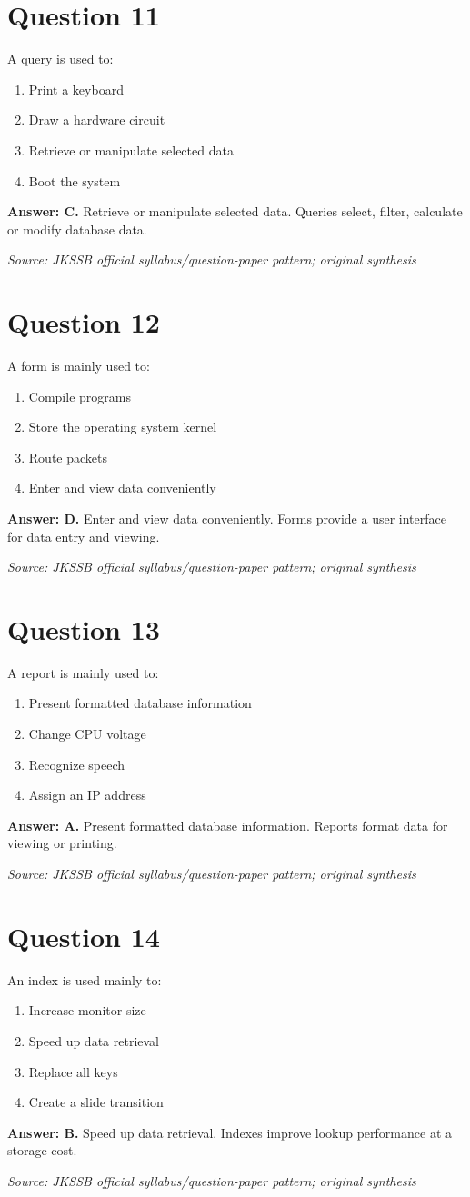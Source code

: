 \documentclass[11pt,a4paper]{book}
\newcommand{\source}[1]{\par\smallskip\textit{Source: #1}}
\newcommand{\answer}[2]{\par\textbf{Answer: #1.} #2}
\begin{document}
\section*{Question 11}
A query is used to:
\begin{enumerate}[label=\Alph*.]
\item Print a keyboard
\item Draw a hardware circuit
\item Retrieve or manipulate selected data
\item Boot the system
\end{enumerate}
\answer{C}{Retrieve or manipulate selected data. Queries select, filter, calculate or modify database data.}
\source{JKSSB official syllabus/question-paper pattern; original synthesis}
\section*{Question 12}
A form is mainly used to:
\begin{enumerate}[label=\Alph*.]
\item Compile programs
\item Store the operating system kernel
\item Route packets
\item Enter and view data conveniently
\end{enumerate}
\answer{D}{Enter and view data conveniently. Forms provide a user interface for data entry and viewing.}
\source{JKSSB official syllabus/question-paper pattern; original synthesis}
\section*{Question 13}
A report is mainly used to:
\begin{enumerate}[label=\Alph*.]
\item Present formatted database information
\item Change CPU voltage
\item Recognize speech
\item Assign an IP address
\end{enumerate}
\answer{A}{Present formatted database information. Reports format data for viewing or printing.}
\source{JKSSB official syllabus/question-paper pattern; original synthesis}
\section*{Question 14}
An index is used mainly to:
\begin{enumerate}[label=\Alph*.]
\item Increase monitor size
\item Speed up data retrieval
\item Replace all keys
\item Create a slide transition
\end{enumerate}
\answer{B}{Speed up data retrieval. Indexes improve lookup performance at a storage cost.}
\source{JKSSB official syllabus/question-paper pattern; original synthesis}
\end{document}
